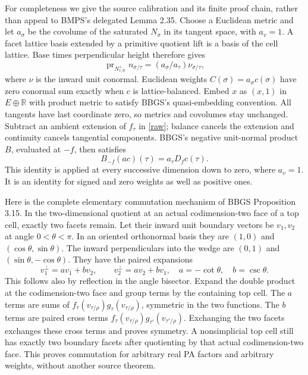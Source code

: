 \documentclass[11pt]{article}
\newcommand{\R}{\mathbb R}
\begin{document}
For completeness we give the source calibration and its finite proof chain, rather than appeal to BMPS's delegated Lemma 2.35. Choose a Euclidean metric and let $a_\sigma$ be the covolume of the saturated $N_\sigma$ in its tangent space, with $a_v=1$. A facet lattice basis extended by a primitive quotient lift is a basis of the cell lattice. Base times perpendicular height therefore gives
\[
 \operatorname{pr}_{N_{\tau,\R}^\perp}n_{\sigma/\tau}
       =(a_\sigma/a_\tau)\nu_{\sigma/\tau},
\]
where $\nu$ is the inward unit conormal. Euclidean weights $C(\sigma)=a_\sigma c(\sigma)$ have zero conormal sum exactly when $c$ is lattice-balanced. Embed $x$ as $(x,1)$ in $E\oplus\R$ with product metric to satisfy BBGS's quasi-embedding convention. All tangents have last coordinate zero, so metrics and covolumes stay unchanged. Subtract an ambient extension of $f_\tau$ in \eqref{raw}; balance cancels the extension and continuity cancels tangential components. BBGS's negative unit-normal product $B$, evaluated at $-f$, then satisfies
\begin{equation}\label{calibration}
 B_{-f}(ac)(\tau)=a_\tau D_fc(\tau).
\end{equation}
This identity is applied at every successive dimension down to zero, where $a_v=1$. It is an identity for signed and zero weights as well as positive ones.

Here is the complete elementary commutation mechanism of BBGS Proposition 3.15. In the two-dimensional quotient at an actual codimension-two face of a top cell, exactly two facets remain. Let their inward unit boundary vectors be $v_1,v_2$ at angle $0<\theta<\pi$. In an oriented orthonormal basis they are $(1,0)$ and $(\cos\theta,\sin\theta)$. The inward perpendiculars into the wedge are $(0,1)$ and $(\sin\theta,-\cos\theta)$. They have the paired expansions
\[
 v_1^\perp=a v_1+b v_2,\qquad v_2^\perp=a v_2+b v_1,
 \quad a=-\cot\theta,\quad b=\csc\theta.
\]
This follows also by reflection in the angle bisector. Expand the double product at the codimension-two face and group terms by the containing top cell. The $a$ terms are sums of $f_\tau(v_{\tau/\rho})g_\tau(v_{\tau/\rho})$, symmetric in the two functions. The $b$ terms are paired cross terms $f_\tau(v_{\tau/\rho})g_{\tau'}(v_{\tau'/\rho})$. Exchanging the two facets exchanges these cross terms and proves symmetry. A nonsimplicial top cell still has exactly two boundary facets after quotienting by that actual codimension-two face. This proves commutation for arbitrary real PA factors and arbitrary weights, without another source theorem.
\end{document}
